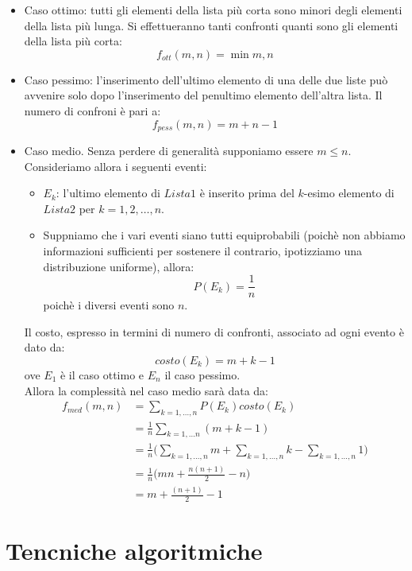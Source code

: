 \documentclass[12pt]{report}
\begin{document}
   	\begin{itemize}
   		\item Caso ottimo: tutti gli elementi della lista più corta sono minori degli elementi della lista più lunga. Si effettueranno tanti confronti quanti sono gli elementi della lista più corta:
   		\[
   		f_{ott}(m, n) = \min{m, n}
   		\]
   		\item Caso pessimo: l'inserimento dell'ultimo elemento di una delle due liste può avvenire solo dopo l'inserimento del penultimo elemento dell'altra lista. Il numero di confroni è pari a:
   		\[
   		f_{pess}(m, n) = m + n - 1
   		\]
   		\item Caso medio. Senza perdere di generalità supponiamo essere $m \leq n$. Consideriamo allora i seguenti eventi:
   		\begin{itemize}
   			\item $E_k$: l'ultimo elemento di $Lista1$ è inserito prima del $k$-esimo elemento di $Lista2$ per $k = 1, 2, \dots, n$.
   			\item Suppniamo che i vari eventi siano tutti equiprobabili (poichè non abbiamo informazioni sufficienti per sostenere il contrario, ipotizziamo una distribuzione uniforme), allora:
   			\[
   			P(E_k) = \frac{1}{n}
   			\]
   			poichè i diversi eventi sono $n$.
   		\end{itemize}
   		Il costo, espresso in termini di numero di confronti, associato ad ogni evento è dato da:
   		\[
   		costo(E_k) = m + k - 1
   		\]
   		ove $E_1$ è il caso ottimo e $E_n$ il caso pessimo. \\
   		Allora la complessità nel caso medio sarà data da:
   		\begin{align*}
   			f_{med}(m, n) &= \sum_{k=1, \dots, n}P(E_k)costo(E_k) \\
   			&= \frac{1}{n}\sum_{k=1, \dots n}(m+k-1) \\
   			&= \frac{1}{n}\Bigg(\sum_{k=1, \dots, n}m + \sum_{k=1, \dots, n}k - \sum_{k=1, \dots, n}1\Bigg) \\
   			&= \frac{1}{n}\Bigg(mn + \frac{n(n+1)}{2} - n\Bigg) \\
   			&= m + \frac{(n+1)}{2} - 1
   		\end{align*}
   	\end{itemize}
   	\chapter{Tencniche algoritmiche}
\end{document}
